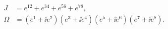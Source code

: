 \begin{equation}
\begin{aligned}
   J &= e^{12} + e^{34} + e^{56} + e^{78} , \\
   \Omega &= (e^1+\ii e^2)(e^3+\ii e^4)(e^5+\ii e^6)(e^7+\ii e^8) .
\end{aligned}
\end{equation}

